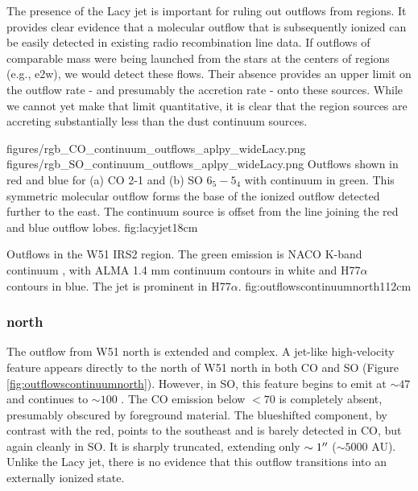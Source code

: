 \documentclass{emulateapj}
\begin{document}
The presence of the Lacy jet is important for ruling out outflows from \hii
regions.  It provides clear evidence that a molecular outflow that is
subsequently ionized can be easily detected in existing radio recombination
line data.  If outflows of comparable mass were being launched from the stars
at the centers of \hchii regions (e.g., e2w), we would detect these flows.
Their absence provides an upper limit on the outflow rate - and presumably the
accretion rate - onto these sources.  While we cannot yet make that limit
quantitative, it is clear that the \hchii region sources are accreting
substantially less than the dust continuum sources.



\FigureTwo
{figures/rgb_CO_continuum_outflows_aplpy_wideLacy.png}
{figures/rgb_SO_continuum_outflows_aplpy_wideLacy.png}
{Outflows shown in red and blue for (a) CO 2-1 and (b) SO $6_5-5_4$ with
continuum in green.  This symmetric molecular outflow forms the base of the
\citet{Lacy2007a} ionized outflow detected further to the east.
The continuum source is offset from the line joining the red and blue outflow lobes.}
{fig:lacyjet}{1}{8cm}


{Outflows in the W51 IRS2 region.  The green emission is NACO K-band continuum
\citep{Barbosa2008a}, with ALMA 1.4 mm continuum contours in white and
H77$\alpha$ contours in blue.  The \citet{Lacy2007a} jet is prominent in
H77$\alpha$.}
{fig:outflowscontinuumnorth}{1}{12cm}

\subsubsection{north}
The outflow from W51 north is extended and complex.
A jet-like high-velocity feature appears directly to the north of W51 north in
both CO and SO (Figure \ref{fig:outflowscontinuumnorth}).  However, in SO, this feature begins to emit at $\sim47$ \kms
and continues to $\sim 100$ \kms.  The CO emission below $<70$ \kms is
completely absent, presumably obscured by foreground material.  The blueshifted
component, by contrast with the red, points to the southeast and is barely
detected in CO, but again cleanly in SO.  It is sharply truncated, extending
only $\sim1 \mbox{$^{\prime\prime}$}$ ($\sim5000$ AU).  Unlike the Lacy jet, there is no
evidence that this outflow transitions into an externally ionized state.
\end{document}
